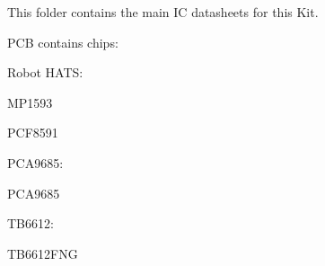 This folder contains the main IC datasheets for this Kit.

PCB contains chips\+:
\begin{DoxyItemize}
\item Robot HATS\+:
\begin{DoxyItemize}
\item MP1593
\item PCF8591
\end{DoxyItemize}
\item PCA9685\+:
\begin{DoxyItemize}
\item PCA9685
\end{DoxyItemize}
\item TB6612\+:
\begin{DoxyItemize}
\item TB6612\+FNG 
\end{DoxyItemize}
\end{DoxyItemize}